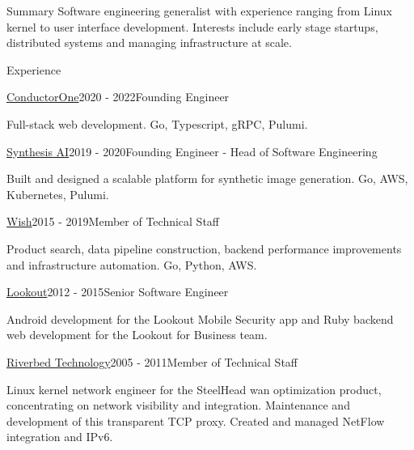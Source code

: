 \documentclass{resume} %
\begin{document}
\begin{rSection}{Summary}
Software engineering generalist with experience ranging from Linux kernel to user interface development. Interests include
early stage startups, distributed systems and managing infrastructure at scale.
\end{rSection}

\begin{rSection}{Experience}

\begin{rSubsection}{\href{https://conductorone.com}{ConductorOne}}{2020 - 2022}{Founding Engineer}{}
\item Full-stack web development. Go, Typescript, gRPC, Pulumi.
\end{rSubsection}

\begin{rSubsection}{\href{https://synthesis.ai}{Synthesis AI}}{2019 - 2020}{Founding Engineer - Head of Software Engineering}{}
\item Built and designed a scalable platform for synthetic image generation. Go, AWS, Kubernetes, Pulumi.
\end{rSubsection}

\begin{rSubsection}{\href{https://wish.com}{Wish}}{2015 - 2019}{Member of Technical Staff}{}
\item Product search, data pipeline construction, backend performance improvements and infrastructure automation. Go, Python, AWS.
\end{rSubsection}

\begin{rSubsection}{\href{https://lookout.com}{Lookout}}{2012 - 2015}{Senior Software Engineer}{}
\item Android development for the Lookout Mobile Security app and Ruby backend web development for the Lookout for Business team.
\end{rSubsection}

\begin{rSubsection}{\href{https://riverbed.com}{Riverbed Technology}}{2005 - 2011}{Member of Technical Staff}{}
\item Linux kernel network engineer for the SteelHead wan optimization product, concentrating on network visibility
  and integration. Maintenance and development of this transparent TCP proxy. Created and managed NetFlow integration and IPv6.
\end{rSubsection}

\end{rSection}
\end{document}
